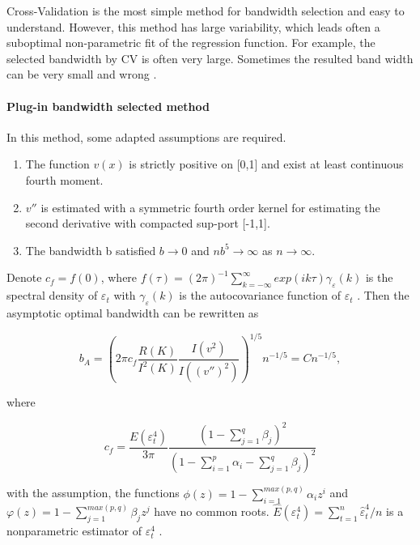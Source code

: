Cross-Validation is the most simple method for bandwidth selection and easy to understand. However, this method has large variability, which leads often a suboptimal non-parametric fit of the regression function. For example, the selected bandwidth by CV is often very large. Sometimes the resulted band width can be very small and wrong \citep{Altman1995}. 

\paragraph{Plug-in bandwidth selected method}

In this method, some adapted assumptions are required.


\begin{enumerate}
  \item The function $v(x)$ is strictly positive on [0,1] and exist at least continuous fourth moment.  
  \item $v''$ is estimated with a symmetric fourth order kernel for estimating the second derivative with compacted sup-port [-1,1].
  \item The bandwidth b satisfied $b \rightarrow 0$ and $nb^{5} \rightarrow \infty $ as $n \rightarrow \infty$.
\end{enumerate}

Denote $c_{f}=f(0)$, where $f(\tau)=(2\pi)^{-1}\sum_{k=-\infty}^{\infty}exp(ik\tau)\gamma_{\varepsilon}(k)$ is the spectral density of $\varepsilon_{t}$ with $\gamma_{\varepsilon}(k)$ is the autocovariance function of $\varepsilon_{t}$ . Then the asymptotic optimal bandwidth can be rewritten as 

\begin{equation}
b_{A} =(2\pi c_{f} \frac{R(K)}{I^{2}(K)}\frac{I(v^{2})}{I((v'')^2)})^{1/5}n^{-1/5} = Cn^{-1/5},
\end{equation}

where

\begin{equation}
c_{f}=\frac{E(\varepsilon_{t}^{4})}{3\pi}\frac{(1-\sum_{j=1}^{q}\beta_{j})^{2}}{(1-\sum_{i=1}^{p}\alpha_{i}-\sum_{j=1}^{q}\beta_{j})^{2}}
\end{equation}
 
with the assumption, the functions $\phi(z)=1-\sum_{i=1}^{max(p,q)}\alpha_{i}z^{i}$ and $\varphi(z)=1-\sum_{j=1}^{max(p,q)}\beta_{j}z^{j}$ have no common roots. $\hat{E}(\varepsilon_t^{4})=\sum_{t=1}^{n}\hat{\varepsilon}_{t}^{4}/n$ is a nonparametric estimator of $\varepsilon_{t}^{4}$ \citep{Feng2004}.

